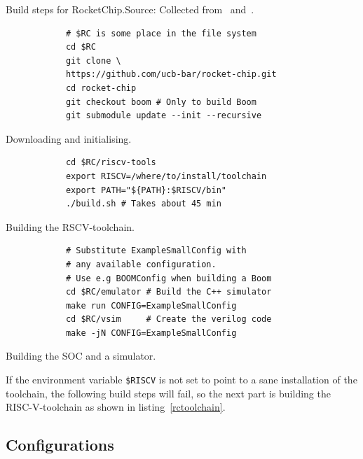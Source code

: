 \documentclass[journal,a4paper]{IEEEtran}
\begin{document}

\begin{table}
	\caption{Build steps for RocketChip.\newline\hspace{\linewidth}Source: Collected from~\cite{rc-github} and~\cite{boom-github}.}
	\begin{subtable}[b]{0.9\linewidth}
		\begin{verbatim}
			# $RC is some place in the file system
			cd $RC
			git clone \
			https://github.com/ucb-bar/rocket-chip.git
			cd rocket-chip
			git checkout boom # Only to build Boom
			git submodule update --init --recursive
		\end{verbatim}
		\caption{Downloading and initialising.}
		\label{rcclone}
	\end{subtable}
	\begin{subtable}[b]{0.9\linewidth}
		\begin{verbatim}
			cd $RC/riscv-tools
			export RISCV=/where/to/install/toolchain
			export PATH="${PATH}:$RISCV/bin"
			./build.sh # Takes about 45 min
		\end{verbatim}
		\caption{Building the RSCV-toolchain.}
		\label{rctoolchain}
	\end{subtable}
	\begin{subtable}[b]{0.9\linewidth}
		\begin{verbatim}
			# Substitute ExampleSmallConfig with
			# any available configuration.
			# Use e.g BOOMConfig when building a Boom
			cd $RC/emulator # Build the C++ simulator
			make run CONFIG=ExampleSmallConfig
			cd $RC/vsim     # Create the verilog code
			make -jN CONFIG=ExampleSmallConfig
		\end{verbatim}
		\caption{Building the SOC and a simulator.}
		\label{rcmake}
	\end{subtable}
\end{table}

If the environment variable \texttt{\$RISCV} is not set to point to a sane installation of the toolchain, the following build steps will fail, so the next part is building the RISC-V-toolchain as shown in listing~\ref{rctoolchain}.

\subsection{Configurations}
\end{document}
